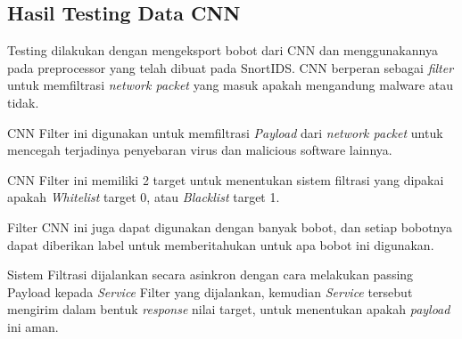 \documentclass[./skripsi.tex]{subfiles}
\begin{document}
\subsection{Hasil Testing Data CNN}
\par Testing dilakukan dengan mengeksport bobot dari CNN dan menggunakannya pada preprocessor yang telah dibuat pada SnortIDS. CNN berperan sebagai \textit{filter} untuk memfiltrasi \textit{network packet} yang masuk apakah mengandung malware atau tidak.
\par CNN Filter ini digunakan untuk memfiltrasi \textit{Payload} dari \textit{network packet} untuk mencegah terjadinya penyebaran virus dan malicious software lainnya.
\par CNN Filter ini memiliki 2 target untuk menentukan sistem filtrasi yang dipakai apakah \textit{Whitelist} target 0, atau \textit{Blacklist} target 1.
\par Filter CNN ini juga dapat digunakan dengan banyak bobot, dan setiap bobotnya dapat diberikan label untuk memberitahukan untuk apa bobot ini digunakan.
\par Sistem Filtrasi dijalankan secara asinkron dengan cara melakukan passing Payload kepada \textit{Service} Filter yang dijalankan, kemudian \textit{Service} tersebut mengirim dalam bentuk \textit{response} nilai target, untuk menentukan apakah \textit{payload} ini aman.
\end{document}
